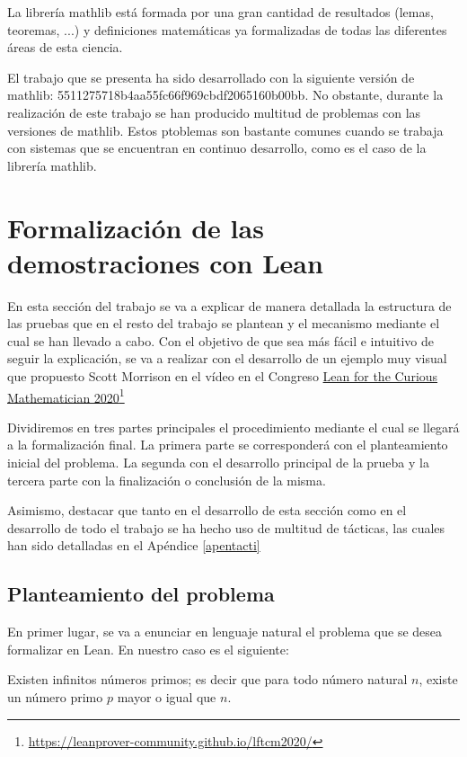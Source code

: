 La librería mathlib está formada por una gran cantidad de resultados (lemas,
teoremas, ...) y definiciones matemáticas ya formalizadas de todas las
diferentes áreas de esta ciencia.

El trabajo que se presenta ha sido desarrollado con la siguiente versión de
mathlib: 5511275718b4aa55fc66f969cbdf2065160b00bb. No obstante, durante la
realización de este trabajo se han producido multitud de problemas con las
versiones de mathlib. Estos ptoblemas son bastante comunes cuando se trabaja
con sistemas que se encuentran en continuo desarrollo, como es el caso de la
librería mathlib.

\section{Formalización de las demostraciones con Lean}

En esta sección del trabajo se va a explicar de manera detallada la
estructura de las pruebas que en el resto del trabajo se plantean y el
mecanismo mediante el cual se han llevado a cabo. Con el objetivo de que
sea más fácil e intuitivo de seguir la explicación, se va a realizar con
el desarrollo de un ejemplo muy visual que propuesto Scott Morrison en
el vídeo \cite{video} en el Congreso
\href{https://leanprover-community.github.io/lftcm2020/}
     {Lean for the Curious Mathematician 2020}\footnote{\url{https://leanprover-community.github.io/lftcm2020/}}

Dividiremos en tres partes principales el procedimiento mediante el
cual se llegará a la formalización final. La primera parte se
corresponderá con el planteamiento inicial del problema. La segunda
con el desarrollo principal de la prueba y la tercera parte con la
finalización o conclusión de la misma.

Asimismo, destacar que tanto en el desarrollo de esta sección como en el
desarrollo de todo el trabajo se ha hecho uso de multitud de tácticas, las
cuales han sido detalladas en el Apéndice \ref{apentacti}

\subsection{Planteamiento del problema}

En primer lugar, se va a enunciar en lenguaje natural el problema que se
desea formalizar en Lean. En nuestro caso es el siguiente:

\begin{teorema}\label{infi}
  Existen infinitos números primos; es decir que para todo número
  natural \(n\), existe un número primo \(p\) mayor o igual que
  \(n\).
\end{teorema}

